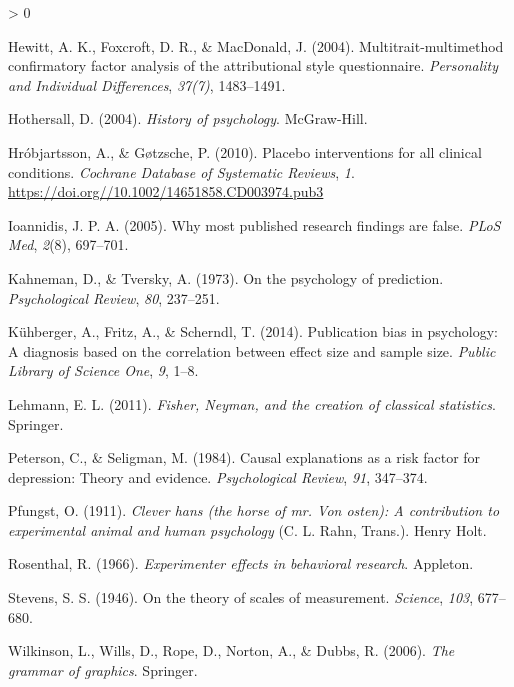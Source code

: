 \documentclass[
]{book}
\newlength{\cslhangindent}
\newenvironment{CSLReferences}[2] %
 {%
  \setlength{\parindent}{0pt}
  \ifodd #1 \everypar{\setlength{\hangindent}{\cslhangindent}}\ignorespaces\fi
  \ifnum #2 > 0
  \setlength{\parskip}{#2\baselineskip}
  \fi
 }%
 {}
\begin{document}
\begin{CSLReferences}{1}{0}
\leavevmode\hypertarget{ref-Hewitt2004}{}%
Hewitt, A. K., Foxcroft, D. R., \& MacDonald, J. (2004). Multitrait-multimethod confirmatory factor analysis of the attributional style questionnaire. \emph{Personality and Individual Differences}, \emph{37(7)}, 1483--1491.

\leavevmode\hypertarget{ref-Hothersall2004}{}%
Hothersall, D. (2004). \emph{History of psychology}. McGraw-Hill.

\leavevmode\hypertarget{ref-hrobjartsson2010}{}%
Hróbjartsson, A., \& Gøtzsche, P. (2010). Placebo interventions for all clinical conditions. \emph{Cochrane Database of Systematic Reviews}, \emph{1}. \url{https://doi.org//10.1002/14651858.CD003974.pub3}

\leavevmode\hypertarget{ref-Ioannidis2005}{}%
Ioannidis, J. P. A. (2005). Why most published research findings are false. \emph{PLoS Med}, \emph{2}(8), 697--701.

\leavevmode\hypertarget{ref-Kahneman1973}{}%
Kahneman, D., \& Tversky, A. (1973). On the psychology of prediction. \emph{Psychological Review}, \emph{80}, 237--251.

\leavevmode\hypertarget{ref-Kuhberger2014}{}%
Kühberger, A., Fritz, A., \& Scherndl, T. (2014). Publication bias in psychology: A diagnosis based on the correlation between effect size and sample size. \emph{Public Library of Science One}, \emph{9}, 1--8.

\leavevmode\hypertarget{ref-Lehmann2011}{}%
Lehmann, E. L. (2011). \emph{Fisher, {N}eyman, and the creation of classical statistics}. Springer.

\leavevmode\hypertarget{ref-Peterson1984}{}%
Peterson, C., \& Seligman, M. (1984). Causal explanations as a risk factor for depression: Theory and evidence. \emph{Psychological Review}, \emph{91}, 347--374.

\leavevmode\hypertarget{ref-Pfungst1911}{}%
Pfungst, O. (1911). \emph{Clever hans (the horse of mr. Von osten): A contribution to experimental animal and human psychology} (C. L. Rahn, Trans.). Henry Holt.

\leavevmode\hypertarget{ref-Rosenthal1966}{}%
Rosenthal, R. (1966). \emph{Experimenter effects in behavioral research}. Appleton.

\leavevmode\hypertarget{ref-Stevens1946}{}%
Stevens, S. S. (1946). On the theory of scales of measurement. \emph{Science}, \emph{103}, 677--680.

\leavevmode\hypertarget{ref-Wilkinson2006}{}%
Wilkinson, L., Wills, D., Rope, D., Norton, A., \& Dubbs, R. (2006). \emph{The grammar of graphics}. Springer.

\end{CSLReferences}
\end{document}
